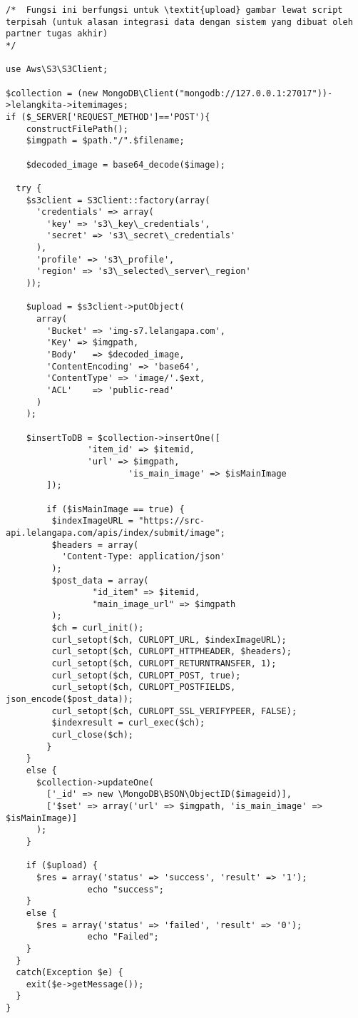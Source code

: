 \begin{lstlisting}[label=cdaws.03-02,style=php,caption=Implementasi \textit{Back-end} \textit{Upload} Gambar Barang]
/*	Fungsi ini berfungsi untuk \textit{upload} gambar lewat script terpisah (untuk alasan integrasi data dengan sistem yang dibuat oleh partner tugas akhir)
*/

use Aws\S3\S3Client;

$collection = (new MongoDB\Client("mongodb://127.0.0.1:27017"))->lelangkita->itemimages;
if ($_SERVER['REQUEST_METHOD']=='POST'){
	constructFilePath();	
	$imgpath = $path."/".$filename;

	$decoded_image = base64_decode($image);

  try {
    $s3client = S3Client::factory(array(
      'credentials' => array(
        'key' => 's3\_key\_credentials',
        'secret' => 's3\_secret\_credentials'
      ),
      'profile' => 's3\_profile',
      'region' => 's3\_selected\_server\_region'
    ));

    $upload = $s3client->putObject(
      array(
        'Bucket' => 'img-s7.lelangapa.com',
        'Key' => $imgpath,
        'Body'   => $decoded_image,
        'ContentEncoding' => 'base64',
        'ContentType' => 'image/'.$ext,
        'ACL'    => 'public-read'
      )
    );

    $insertToDB = $collection->insertOne([
                'item_id' => $itemid,
                'url' => $imgpath,
                        'is_main_image' => $isMainImage
        ]);

        if ($isMainImage == true) {
         $indexImageURL = "https://src-api.lelangapa.com/apis/index/submit/image";
         $headers = array(
           'Content-Type: application/json'
         );
         $post_data = array(
                 "id_item" => $itemid,
                 "main_image_url" => $imgpath
         );
         $ch = curl_init();
         curl_setopt($ch, CURLOPT_URL, $indexImageURL);
         curl_setopt($ch, CURLOPT_HTTPHEADER, $headers);
         curl_setopt($ch, CURLOPT_RETURNTRANSFER, 1);
         curl_setopt($ch, CURLOPT_POST, true);
         curl_setopt($ch, CURLOPT_POSTFIELDS, json_encode($post_data));
         curl_setopt($ch, CURLOPT_SSL_VERIFYPEER, FALSE);
         $indexresult = curl_exec($ch);
         curl_close($ch);
        }
    }
    else {
      $collection->updateOne(
        ['_id' => new \MongoDB\BSON\ObjectID($imageid)],
        ['$set' => array('url' => $imgpath, 'is_main_image' => $isMainImage)]
      );
    }

    if ($upload) {
      $res = array('status' => 'success', 'result' => '1');
                echo "success";
    }
    else {
      $res = array('status' => 'failed', 'result' => '0');
                echo "Failed";
    }
  }
  catch(Exception $e) {
    exit($e->getMessage());
  }
}


\end{lstlisting}
